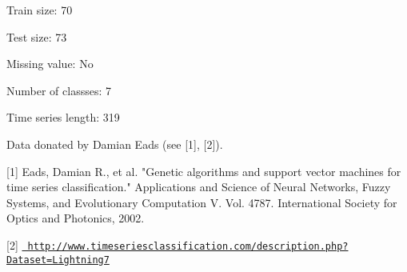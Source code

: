 Train size\+: 70

Test size\+: 73

Missing value\+: No

Number of classses\+: 7

Time series length\+: 319

Data donated by Damian Eads (see \mbox{[}1\mbox{]}, \mbox{[}2\mbox{]}).

\mbox{[}1\mbox{]} Eads, Damian R., et al. "{}\+Genetic algorithms and support vector machines for time series classification."{} Applications and Science of Neural Networks, Fuzzy Systems, and Evolutionary Computation V. Vol. 4787. International Society for Optics and Photonics, 2002.

\mbox{[}2\mbox{]} \href{http://www.timeseriesclassification.com/description.php?Dataset=Lightning7}{\texttt{ http\+://www.\+timeseriesclassification.\+com/description.\+php?\+Dataset=\+Lightning7}} 